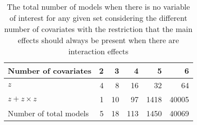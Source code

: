 \begin{table}[!h]
\centering
\caption{The total number of models when there is no variable of interest for any given set considering the different number of covariates with the restriction that the main effects should always be present when there are interaction effects} 
\label{tab:appmodel7}
\begin{tabular}{lrrrrr}
  \hline
Number of covariates & 2 & 3 & 4 & 5 & 6 \\ 
  \hline
  $ z$ & 4 & 8 & 16 & 32 & 64 \\ 
  $ z + z \times z$ & 1 & 10 & 97 & 1418 & 40005 \\ 
  \hline
  Number of total models & 5 & 18 & 113 & 1450 & 40069 \\ 
   \hline
\end{tabular}
\end{table}
